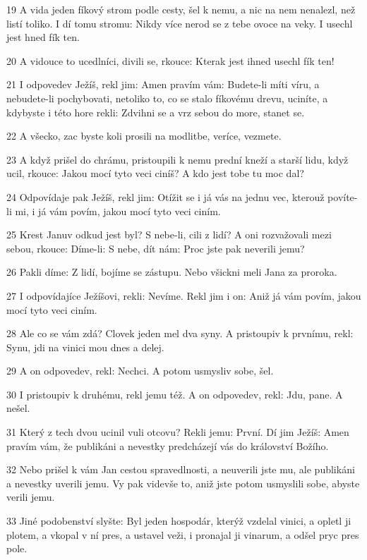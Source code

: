 \par 19 A vida jeden fíkový strom podle cesty, šel k nemu, a nic na nem nenalezl, než listí toliko. I dí tomu stromu: Nikdy více nerod se z tebe ovoce na veky. I usechl jest hned fík ten.
\par 20 A vidouce to ucedlníci, divili se, rkouce: Kterak jest ihned usechl fík ten!
\par 21 I odpovedev Ježíš, rekl jim: Amen pravím vám: Budete-li míti víru, a nebudete-li pochybovati, netoliko to, co se stalo fíkovému drevu, uciníte, a kdybyste i této hore rekli: Zdvihni se a vrz sebou do more, stanet se.
\par 22 A všecko, zac byste koli prosili na modlitbe, veríce, vezmete.
\par 23 A když prišel do chrámu, pristoupili k nemu prední kneží a starší lidu, když ucil, rkouce: Jakou mocí tyto veci ciníš? A kdo jest tobe tu moc dal?
\par 24 Odpovídaje pak Ježíš, rekl jim: Otížit se i já vás na jednu vec, kterouž povíte-li mi, i já vám povím, jakou mocí tyto veci ciním.
\par 25 Krest Januv odkud jest byl? S nebe-li, cili z lidí? A oni rozvažovali mezi sebou, rkouce: Díme-li: S nebe, dít nám: Proc jste pak neverili jemu?
\par 26 Pakli díme: Z lidí, bojíme se zástupu. Nebo všickni meli Jana za proroka.
\par 27 I odpovídajíce Ježíšovi, rekli: Nevíme. Rekl jim i on: Aniž já vám povím, jakou mocí tyto veci ciním.
\par 28 Ale co se vám zdá? Clovek jeden mel dva syny. A pristoupiv k prvnímu, rekl: Synu, jdi na vinici mou dnes a delej.
\par 29 A on odpovedev, rekl: Nechci. A potom usmysliv sobe, šel.
\par 30 I pristoupiv k druhému, rekl jemu též. A on odpovedev, rekl: Jdu, pane. A nešel.
\par 31 Který z tech dvou ucinil vuli otcovu? Rekli jemu: První. Dí jim Ježíš: Amen pravím vám, že publikáni a nevestky predcházejí vás do království Božího.
\par 32 Nebo prišel k vám Jan cestou spravedlnosti, a neuverili jste mu, ale publikáni a nevestky uverili jemu. Vy pak videvše to, aniž jste potom usmyslili sobe, abyste verili jemu.
\par 33 Jiné podobenství slyšte: Byl jeden hospodár, kterýž vzdelal vinici, a opletl ji plotem, a vkopal v ní pres, a ustavel veži, i pronajal ji vinarum, a odšel pryc pres pole.
